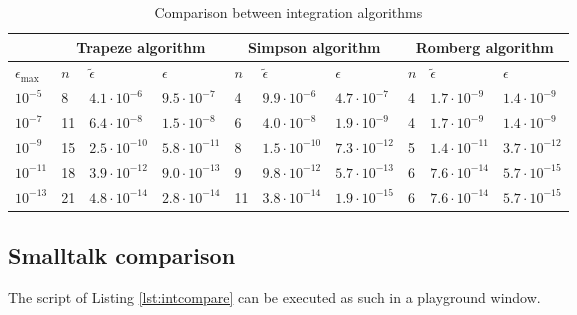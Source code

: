 \begin{table}[h]
  \centering
  \caption{Comparison between integration algorithms}\label{tb:intcompar}
\vspace{1 ex}
\begin{tabular}{|l|l|l|l|l|l|l|l|l|l|} \hline
  &\multicolumn{3}{c|}{\textbf{Trapeze algorithm}} &\multicolumn{3}{c|}{\textbf{Simpson algorithm}}&\multicolumn{3}{c|}{\textbf{Romberg algorithm}}  \\ \hline
  $\epsilon_{\mathop{\textrm{max}}}$ & $n$ & $\tilde{\epsilon}$ & $\epsilon$ & $n$ & $\tilde{\epsilon}$ & $\epsilon$ & $n$ & $\tilde{\epsilon}$ & $\epsilon$
  \\ \hline
$10^{-5}$&8&$4.1\cdot 10^{-6}$&$9.5\cdot 10^{-7}$&4&$9.9\cdot
10^{-6}$&$4.7\cdot 10^{-7}$&4&$1.7\cdot 10^{-9}$&$1.4\cdot
10^{-9}$\\ \hline $10^{-7}$&11&$6.4\cdot 10^{-8}$&$1.5\cdot
10^{-8}$&6&$4.0\cdot 10^{-8}$&$1.9\cdot 10^{-9}$&4&$1.7\cdot
10^{-9}$&$1.4\cdot 10^{-9}$\\ \hline $10^{-9}$ &15&$2.5\cdot
10^{-10}$&$5.8\cdot 10^{-11}$&8&$1.5\cdot 10^{-10}$&$7.3\cdot
10^{-12}$&5&$1.4\cdot 10^{-11}$&$3.7\cdot 10^{-12}$\\ \hline
$10^{-11}$ &18&$3.9\cdot 10^{-12}$&$9.0\cdot 10^{-13}$&9&$9.8\cdot
10^{-12}$&$5.7\cdot 10^{-13}$&6&$7.6\cdot 10^{-14}$&$5.7\cdot
10^{-15}$\\ \hline $10^{-13}$&21&$4.8\cdot 10^{-14}$&$2.8\cdot
10^{-14}$&11&$3.8\cdot 10^{-14}$&$1.9\cdot 10^{-15}$&6&$7.6\cdot
10^{-14}$&$5.7\cdot 10^{-15}$\\ \hline
\end{tabular}
\end{table}

\subsection{Smalltalk comparison}
\label{sec:sintcompar} The script of Listing \ref{lst:intcompare}
can be executed as such in a playground window.

